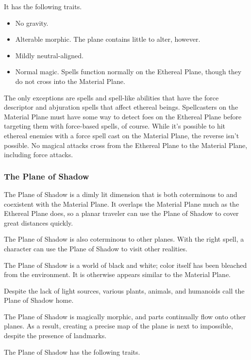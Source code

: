 It has the following traits.

\begin{itemize}
\item No gravity.
\item Alterable morphic. The plane contains little to alter, however.
\item Mildly neutral-aligned.
\item Normal magic. Spells function normally on the Ethereal Plane, though they do not 
cross into the Material Plane. 
\end{itemize}

The only exceptions are spells and spell-like abilities that have the force descriptor 
and abjuration spells that affect ethereal beings. Spellcasters on the Material 
Plane must have some way to detect foes on the Ethereal Plane before targeting 
them with force-based spells, of course. While it's possible to hit ethereal enemies 
with a force spell cast on the Material Plane, the reverse isn't possible. No magical 
attacks cross from the Ethereal Plane to the Material Plane, including force attacks.

\subsubsection{The Plane of Shadow}

The Plane of Shadow is a dimly lit dimension that is both coterminous to 
and coexistent with the Material Plane. It overlaps the Material Plane much as 
the Ethereal Plane does, so a planar traveler can use the Plane of Shadow to cover 
great distances quickly.

The Plane of Shadow is also coterminous to other planes. With the right spell, 
a character can use the Plane of Shadow to visit other realities.

The Plane of Shadow is a world of black and white; color itself has been bleached 
from the environment. It is otherwise appears similar to the Material Plane.

Despite the lack of light sources, various plants, animals, and humanoids call 
the Plane of Shadow home.

The Plane of Shadow is magically morphic, and parts continually flow onto other 
planes. As a result, creating a precise map of the plane is next to impossible, 
despite the presence of landmarks.

The Plane of Shadow has the following traits.

